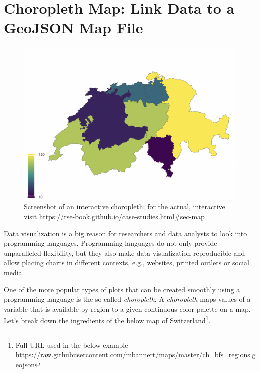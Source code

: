 \documentclass[
  12pt,
  letterpaper,
]{krantz}
\begin{document}
\hypertarget{sec-map}{%
\section{\texorpdfstring{Choropleth Map: Link Data to a
GeoJSON Map
File}{Choropleth Map: Link Data to a GeoJSON Map File}}\label{sec-map}}

\begin{figure}

{\centering \includegraphics{./images/case-choropleth.png}

}

\caption{Screenshot of an interactive choropleth; for the actual,
interactive visit https://rse-book.github.io/case-studies.html\#sec-map}

\end{figure}

Data visualization is a big reason for researchers and data analysts to
look into programming languages. Programming languages do not only
provide unparalleled flexibility, but they also make data visualization
reproducible and allow placing charts in different contexts, e.g.,
websites, printed outlets or social media.

One of the more popular types of plots that can be created smoothly
using a programming language is the so-called
\emph{choropleth}. A \emph{choropleth} maps values of
a variable that is available by region to a given continuous color
palette on a map. Let's break down the ingredients of the below map of
Switzerland\footnote{Full URL used in the below example
  https://raw.githubusercontent.com/mbannert/maps/master/ch\_bfs\_regions.geojson}.
\end{document}
